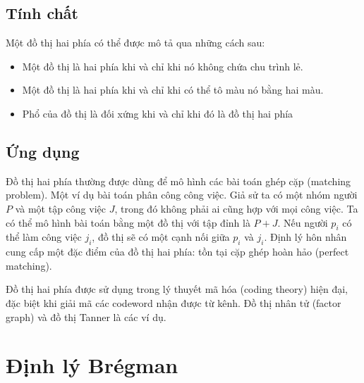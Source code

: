 \documentclass[a4paper, 12pt]{report}
\begin{document}
\subsection{Tính chất}
Một đồ thị hai phía có thể được mô tả qua những cách sau: 
\begin{itemize}
	\item Một đồ thị là hai phía khi và chỉ khi nó không chứa chu trình lẻ.
	\item Một đồ thị là hai phía khi và chỉ khi có thể tô màu nó bằng hai màu.
	\item Phổ của đồ thị là đối xứng khi và chỉ khi đó là đồ thị hai phía


\end{itemize}
\subsection{Ứng dụng}
Đồ thị hai phía thường được dùng để mô hình các bài toán ghép cặp (matching problem). Một ví dụ bài toán phân công công việc. Giả sử ta có một nhóm người $P$ và một tập công việc $J$, trong đó không phải ai cũng hợp với mọi công việc. Ta có thể mô hình bài toán bằng một đồ thị với tập đỉnh là $ P + J$. Nếu người $p_i$ có thể làm công việc $j_i$, đồ thị sẽ có một cạnh nối giữa $p_i$ và $j_i$. Định lý hôn nhân cung cấp một đặc điểm của đồ thị hai phía: tồn tại cặp ghép hoàn hảo (perfect matching).

Đồ thị hai phía được sử dụng trong lý thuyết mã hóa (coding theory) hiện đại, đặc biệt khi giải mã các codeword nhận được từ kênh. Đồ thị nhân tử (factor graph) và đồ thị Tanner là các ví dụ.

\section{Định lý Brégman}
\end{document}
